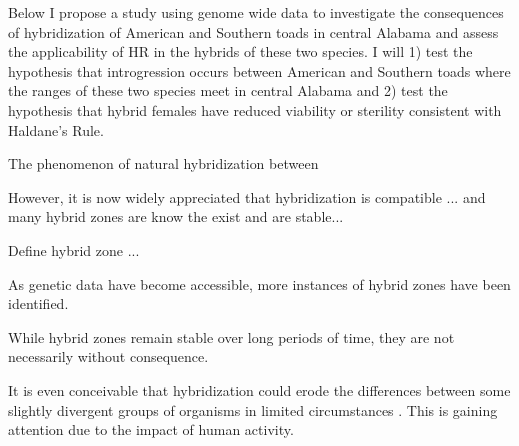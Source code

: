 Below I propose a study using genome wide data to investigate the consequences 
of hybridization of American and Southern toads in central Alabama and assess 
the applicability of HR in the hybrids of these two species. I will 1) test the 
hypothesis that introgression occurs between American and Southern toads where 
the ranges of these two species meet in central Alabama and 2) test the hypothesis 
that hybrid females have reduced viability or sterility consistent with Haldane’s Rule.


The phenomenon of natural hybridization between 

However, it is now widely appreciated that hybridization is compatible ... and many hybrid
zones are know the exist and are stable... \parencite{mallet2005}

Define hybrid zone ...

As genetic data have become accessible, more instances of hybrid zones have been identified. 


While hybrid zones remain stable over long periods of time, they are not necessarily  
without consequence.

It is even conceivable that hybridization could erode the differences between 
some slightly divergent groups of organisms in limited circumstances  \citationNeeded.
This is gaining attention due to the impact of human activity. \citationNeeded 

